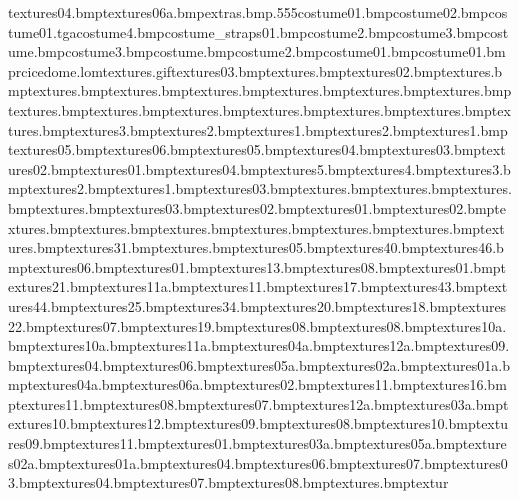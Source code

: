 textures\frozentreats04.bmp textures\sdomestripblu06a.bmp extras\map.bmp.555 costume\snowboardhat01.bmp costume\snowboardhat02.bmp costume\crashhelmetvisor01.tga costume\tongueline4.bmp costume\safaripack_straps01.bmp costume\bodyeyebrow2.bmp costume\eyetex3.bmp costume\muzzlestubble.bmp costume\bodytoes3.bmp costume\noseshine.bmp costume\earslined2.bmp costume\snowboardboard01.bmp costume\snowboardvisor01.bmp rcicedome.lom textures\goarrow.gif textures\tazstopwood03.bmp textures\tazstopsign.bmp textures\tazstopwood02.bmp textures\leaffrosttree.bmp textures\leaffrost.bmp textures\leaftree.bmp textures\leafred.bmp textures\leafpurple.bmp textures\leafgreen.bmp textures\leafblue.bmp textures\baubleblue.bmp textures\baubleyellow.bmp textures\baublepink.bmp textures\star.bmp textures\holly.bmp textures\presentblue.bmp textures\presentpink.bmp textures\white3.bmp textures\white2.bmp textures\white1.bmp textures\lp2.bmp textures\lp1.bmp textures\whackbit05.bmp textures\splinter06.bmp textures\splinter05.bmp textures\splinter04.bmp textures\splinter03.bmp textures\splinter02.bmp textures\splinter01.bmp textures\whackbit04.bmp textures\bombbit5.bmp textures\bombbit4.bmp textures\bombbit3.bmp textures\bombbit2.bmp textures\bombbit1.bmp textures\whackbit03.bmp textures\cheese.bmp textures\candycane.bmp textures\spinningtop.bmp textures\rubixcube.bmp textures\snowbit03.bmp textures\snowbit02.bmp textures\snowbit01.bmp textures\whackbit02.bmp textures\legoyellow.bmp textures\legored.bmp textures\dartboard.bmp textures\playbrick.bmp textures\basketball.bmp textures\basballbat.bmp textures\beachball.bmp textures\snowturf31.bmp textures\snowtile.bmp textures\sdomestrip05.bmp textures\snowturf40.bmp textures\snowturf46.bmp textures\snowdecal06.bmp textures\snowturf01.bmp textures\snowturf13.bmp textures\sdomestripi08.bmp textures\snowfoot01.bmp textures\snowturf21.bmp textures\sdomestrip11a.bmp textures\snowturf11.bmp textures\snowturf17.bmp textures\snowturf43.bmp textures\snowturf44.bmp textures\snowturf25.bmp textures\snowturf34.bmp textures\snowturf20.bmp textures\snowturf18.bmp textures\snowturf22.bmp textures\sdomestrip07.bmp textures\snowturf19.bmp textures\snowturf08.bmp textures\sdomestrip08.bmp textures\sdomestrip10a.bmp textures\sdomestripblu10a.bmp textures\sdomestripblu11a.bmp textures\sdomestripblu04a.bmp textures\sdomestrip12a.bmp textures\sdomestrip09.bmp textures\sdomestrip04.bmp textures\sdomestrip06.bmp textures\sdomestrip05a.bmp textures\sdomestrip02a.bmp textures\sdomestrip01a.bmp textures\sdomestrip04a.bmp textures\sdomestrip06a.bmp textures\sdomestrip02.bmp textures\snowbeam11.bmp textures\snowturf16.bmp textures\sdomestrip11.bmp textures\sdomestripblu08.bmp textures\sdomestripblu07.bmp textures\sdomestripblu12a.bmp textures\sdomestrip03a.bmp textures\sdomestrip10.bmp textures\sdomestrip12.bmp textures\sdomestripblu09.bmp textures\snowbeam08.bmp textures\snowbeam10.bmp textures\snowbeam09.bmp textures\sdomestripi11.bmp textures\whackbit01.bmp textures\sdomestripblu03a.bmp textures\sdomestripblu05a.bmp textures\sdomestripblu02a.bmp textures\sdomestripblu01a.bmp textures\sdomestripblu04.bmp textures\sdomestripblu06.bmp textures\snowbeam07.bmp textures\snowbeam03.bmp textures\snowbeam04.bmp textures\snowdecal07.bmp textures\snowdecal08.bmp textures\frozentreats.bmp textur
